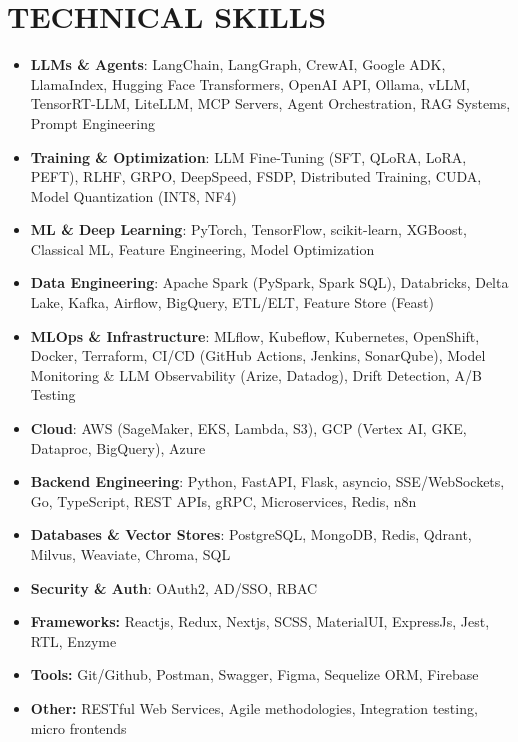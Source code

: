 \documentclass[a4paper]{article}
\begin{document}
\section*{TECHNICAL SKILLS}
\setlength{\arrayrulewidth}{1.2pt}
\begin{itemize}
\item \textbf{LLMs \& Agents}{: LangChain, LangGraph, CrewAI, Google ADK, LlamaIndex, Hugging Face Transformers, OpenAI API, Ollama, vLLM, TensorRT-LLM, LiteLLM, MCP Servers, Agent Orchestration, RAG Systems, Prompt Engineering}
\item \textbf{Training \& Optimization}{: LLM Fine-Tuning (SFT, QLoRA, LoRA, PEFT), RLHF, GRPO, DeepSpeed, FSDP, Distributed Training, CUDA, Model Quantization (INT8, NF4)}
\item \textbf{ML \& Deep Learning}{: PyTorch, TensorFlow, scikit-learn, XGBoost, Classical ML, Feature Engineering, Model Optimization}
\item \textbf{Data Engineering}{: Apache Spark (PySpark, Spark SQL), Databricks, Delta Lake, Kafka, Airflow, BigQuery, ETL/ELT, Feature Store (Feast)}
\item \textbf{MLOps \& Infrastructure}{: MLflow, Kubeflow, Kubernetes, OpenShift, Docker, Terraform, CI/CD (GitHub Actions, Jenkins, SonarQube), Model Monitoring \& LLM Observability (Arize, Datadog), Drift Detection, A/B Testing}
\item \textbf{Cloud}{: AWS (SageMaker, EKS, Lambda, S3), GCP (Vertex AI, GKE, Dataproc, BigQuery), Azure}
\item \textbf{Backend Engineering}{: Python, FastAPI, Flask, asyncio, SSE/WebSockets, Go, TypeScript, REST APIs, gRPC, Microservices, Redis, n8n}
\item \textbf{Databases \& Vector Stores}{: PostgreSQL, MongoDB, Redis, Qdrant, Milvus, Weaviate, Chroma, SQL}
\item \textbf{Security \& Auth}{: OAuth2, AD/SSO, RBAC}
\item \textbf{Frameworks:} Reactjs, Redux, Nextjs, SCSS, MaterialUI, ExpressJs, Jest, RTL, Enzyme
\item \textbf{Tools:} Git/Github, Postman, Swagger, Figma, Sequelize ORM, Firebase
\item \textbf{Other:} RESTful Web Services, Agile methodologies, Integration testing, micro frontends
\end{itemize}
\end{document}
